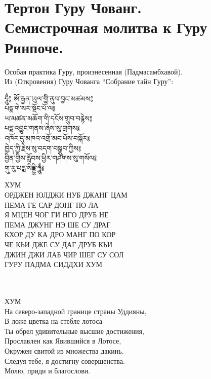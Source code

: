 \section{Тертон Гуру Чованг.\\Семистрочная молитва к Гуру Ринпоче.}

\vspace{1cm}

\scriptsize
Особая практика Гуру, произнесенная (Падмасамбхавой).\\
Из (Откровения) Гуру Чованга “Собрание тайн Гуру”:
\vspace{1cm}
\normalsize
\\
\begingroup
\parbox[t][][l]{0.40\textwidth}{
\ti ཧཱུྃ༔ ཨོ་རྒྱན་ཡུལ་གྱི་ནུབ་བྱང་མཚམས༔\\
པདྨ་གེ་སར་སྡོང་པོ་ལ༔\\
ཡ་མཚན་མཆོག་གི་དངོས་གྲུབ་བརྙེས༔\\
པདྨ་འབྱུང་གནས་ཞེས་སུ་གྲགས༔\\
འཁོར་དུ་མཁའ་འགྲོ་མང་པོས་བསྐོར༔\\
ཁྱེད་ཀྱི་རྗེས་སུ་བདག་བསྒྲུབ་ཀྱིས༔\\
བྱིན་གྱིས་རློབས་ཕྱིར་གཤེགས་སུ་གསོལ༔\\
གུ་རུ་པདྨ་སིདྡྷི་ཧཱུྃ༔\\
\ru
}
\hspace{0.2cm}
\parbox[t][][r]{0.60\textwidth}{
\small
\vspace{0.1cm}
ХУМ \\
ОРДЖЕН ЮЛДЖИ НУБ ДЖАНГ ЦАМ\\
ПЕМА ГЕ САР ДОНГ ПО ЛА\\
Я МЦЕН ЧОГ ГИ НГО ДРУБ НЕ\\
ПЕМА ДЖУНГ НЭ ШЕ СУ ДРАГ\\
КХОР ДУ КА ДРО МАНГ ПО КОР\\
ЧЕ КЬИ ДЖЕ СУ ДАГ ДРУБ КЬИ\\
ДЖИН ДЖИ ЛАБ ЧИР ШЕГ СУ СОЛ\\
ГУРУ ПАДМА СИДДХИ ХУМ\\
}
\endgroup
\\
\vspace{1cm}
\\
ХУМ \\
На северо-западной границе страны Уддияны,\\
В ложе цветка на стебле лотоса\\
Ты обрел удивительные высшие достижения,\\
Прославлен как Явившийся в Лотосе,\\
Окружен свитой из множества дакинь.\\
Следуя тебе, я достигну совершенства.\\
Молю, приди и благослови.\\
\\
